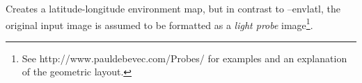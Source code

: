 Creates a latitude-longitude environment map, but in contrast to
{\cf --envlatl}, the original input image is assumed to be formatted
as a \emph{light probe} image\footnote{See
{\cf http://www.pauldebevec.com/Probes/} for examples and an explanation
of the geometric layout.}.
\apiend




\begin{comment}

\section{{\cf maketx} Recipes}


This section will give quick examples of common uses of {\cf maketx}.

\subsection*{Converting between file formats}

It's a snap to converting among image formats supported by \product
(i.e., for which \ImageInput and \ImageOutput plugins can be found).
The {\cf maketx} utility will simply infer the file format from the
file extension. The following example converts a PNG image to JPEG:

\begin{code}
    maketx lena.png lena.jpg
\end{code}

\end{comment}

